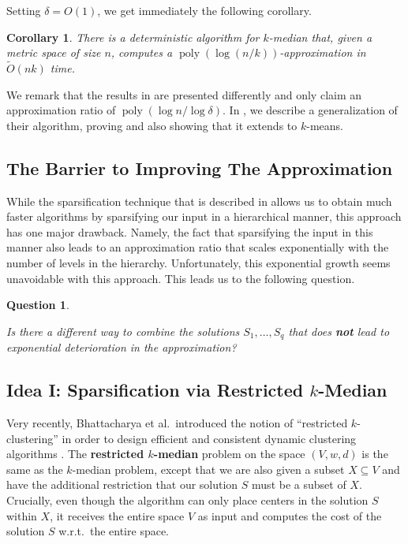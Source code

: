 \documentclass[11pt]{article}
\newenvironment{wrapper}[1]
{
\begin{center}
		\begin{minipage}{\linewidth}
			\begin{mdframed}[hidealllines=true, backgroundcolor=gray!20, leftmargin=0cm,innerleftmargin=0.4cm,innerrightmargin=0.4cm,innertopmargin=0.4cm,innerbottommargin=0.4cm,roundcorner=0pt]
				#1}
			{\end{mdframed}
		\end{minipage}
	\end{center}
}
\newcommand{\1}{\mathmybb{1}}
\newtheorem{corollary}[theorem]{Corollary}
\newtheorem{question}{Question}
\DeclareMathOperator*{\poly}{poly}
\begin{document}
Setting $\delta = O(1)$, we get immediately the following corollary.

\begin{corollary}
    There is a deterministic algorithm for $k$-median that, given a metric space of size $n$, computes a $\poly(\log(n/k))$-approximation in $\tilde O(nk)$ time.
\end{corollary}

We remark that the results in \cite{focs/GuhaMMO00} are presented differently and only claim an approximation ratio of $\poly(\log n /\log \delta)$. In , we describe a generalization of their algorithm, proving  and also showing that it extends to $k$-means.

\subsection{The Barrier to Improving The Approximation}

While the sparsification technique that is described in  allows us to obtain much faster algorithms by sparsifying our input in a hierarchical manner, this approach has one major drawback. Namely, the fact that sparsifying the input in this manner also leads to an approximation ratio that scales exponentially with the number of levels in the hierarchy. Unfortunately, this exponential growth seems unavoidable with this approach. This leads us to the following question.
\begin{wrapper}
\begin{question}\label{Q2}
\begin{center}
Is there a different way to combine the solutions $S_1, \dots,S_q$ that does \textbf{\emph{not}} lead to exponential deterioration in the approximation?
\end{center}
\end{question}
\end{wrapper}


\subsection{Idea I: Sparsification via Restricted $k$-Median}

Very recently, Bhattacharya et al.~introduced the notion of ``restricted $k$-clustering'' in order to design efficient and consistent dynamic clustering algorithms \cite{focs/BCLP24}. The \textbf{restricted $k$-median} problem on the space $(V,w,d)$ is the same as the $k$-median problem, except that we are also given a subset $X \subseteq V$ and have the additional restriction that our solution $S$ must be a subset of $X$. Crucially, even though the algorithm can only place centers in the solution $S$ within $X$, it receives the entire space $V$ as input and computes the cost of the solution $S$ w.r.t.~the entire space. 
\end{document}
